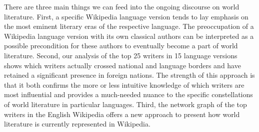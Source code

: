 \documentclass[a4paper,12pt]{scrartcl}
\begin{document}
There are three main things we can feed into the ongoing discourse on
world literature. First, a specific Wikipedia language version tends
to lay emphasis on the most eminent literary eras of the respective
language. The preoccupation of a Wikipedia language version with its
own classical authors can be interpreted as a possible precondition
for these authors to eventually become a part of world literature.
Second, our analysis of the
top 25 writers in 15 language versions shows which writers actually
crossed national and language borders and have retained a significant
presence in foreign nations. The strength of this approach is that it
both confirms the more or less intuitive knowledge of which writers
are most influential and provides a much-needed nuance to the
specific constellations of world literature in particular languages.
Third, the network graph of the top writers
in the English Wikipedia offers a new approach to present how world
literature is currently represented in Wikipedia.
%
%
%
%



%
\end{document}
